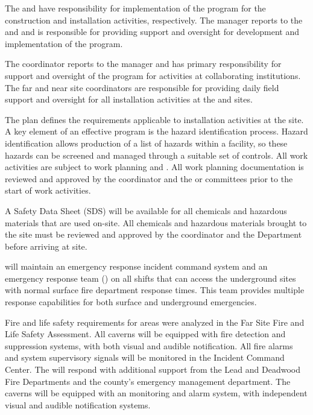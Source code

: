 The  and  have responsibility for
implementation of the   program for the construction and installation activities, respectively.  The
  manager reports to the
 and  and is responsible for providing
 support and oversight for development and implementation of the 
  program. 

The   coordinator reports to the
  manager and has primary responsibility
for  support and oversight of the  
program for activities at collaborating institutions.  The far and near site
 coordinators are responsible for providing daily field support and
oversight for all installation activities at the 
and  sites.

The   plan defines the 
requirements applicable to installation activities at the 
site. A key element of an effective  program is the hazard
identification process. Hazard identification allows production of a
list of hazards within a facility, so these hazards can be screened
and managed through a suitable set of controls. All work activities
are subject to work planning and .  
All work planning documentation is reviewed and
approved by the   coordinator and the 
 or  committees prior to the start of work activities.

A Safety Data Sheet (SDS) will be available for all chemicals and
hazardous materials that are used on-site. All chemicals and hazardous
materials brought to the  site must be reviewed and approved by the
  coordinator and the  
Department before arriving at site.

 will maintain an emergency response incident command
system and an emergency response team () on all shifts that can access the
underground sites with normal surface fire department response
times. This team provides multiple response capabilities for both
surface and underground emergencies.

Fire and life safety requirements for  areas were
analyzed in the  Far Site Fire and Life Safety
  Assessment. All caverns will be equipped with
fire detection and suppression systems, with both visual and audible
notification.  All fire alarms and system supervisory signals will be
monitored in the  Incident Command Center.  The
  will respond with additional support from the
Lead and Deadwood Fire Departments and the county's emergency management
department. The caverns will be equipped with
an  monitoring and alarm system, with independent visual and
audible notification systems.

